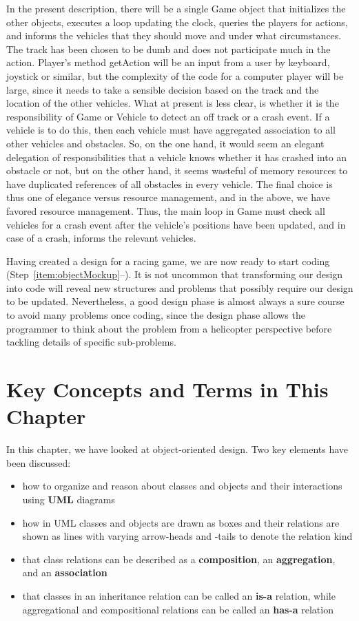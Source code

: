 \documentclass[fsharpNotes.tex]{subfiles}
\begin{document}
In the present description, there will be a single Game object that initializes the other objects, executes a loop updating the clock, queries the players for actions, and informs the vehicles that they should move and under what circumstances. The track has been chosen to be dumb and does not participate much in the action. Player's method getAction will be an input from a user by keyboard, joystick or similar, but the complexity of the code for a computer player will be large, since it needs to take a sensible decision based on the track and the location of the other vehicles. What at present is less clear, is whether it is the responsibility of Game or Vehicle to detect an off track or a crash event. If a vehicle is to do this, then each vehicle must have aggregated association to all other vehicles and obstacles. So, on the one hand, it would seem an elegant delegation of responsibilities that a vehicle knows whether it has crashed into an obstacle or not, but on the other hand, it seems wasteful of memory resources to have duplicated references of all obstacles in every vehicle. The final choice is thus one of elegance versus resource management, and in the above, we have favored resource management. Thus, the main loop in Game must check all vehicles for a crash event after the vehicle's positions have been updated, and in case of a crash, informs the relevant vehicles.

Having created a design for a racing game, we are now ready to start coding (Step~\ref{item:objectMockup}--). It is not uncommon that transforming our design into code will reveal new structures and problems that possibly require our design to be updated. Nevertheless, a good design phase is almost always a sure course to avoid many problems once coding, since the design phase allows the programmer to think about the problem from a helicopter perspective before tackling details of specific sub-problems.

\section{Key Concepts and Terms in This Chapter}
In this chapter, we have looked at object-oriented design. Two key elements have been discussed:
\begin{itemize}
\item how to organize and reason about classes and objects and their interactions using \textbf{UML} diagrams
\item how in UML classes and objects are drawn as boxes and their relations are shown as lines with varying arrow-heads and -tails to denote the relation kind
\item that class relations can be described as a \textbf{composition}, an \textbf{aggregation}, and an \textbf{association}
\item that classes in an inheritance relation can be called an \textbf{is-a} relation, while aggregational and compositional relations can be called an \textbf{has-a} relation
\end{itemize}
\end{document}
